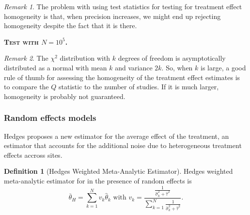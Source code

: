 \documentclass[
]{book}
\theoremstyle{definition}
\newtheorem{definition}{Definition}[chapter]
\theoremstyle{definition}
\theoremstyle{definition}
\theoremstyle{definition}
\theoremstyle{remark}
\newtheorem*{remark}{Remark}
\begin{document}
\begin{remark}
\iffalse{} {Remark. } \fi{}The problem with using test statistics for testing for treatment effect homogeneity is that, when precision increases, we might end up rejecting homogeneity despite the fact that it is there.
\end{remark}

\textbf{\textsc{Test with \(N=10^5\).}}

\begin{remark}
\iffalse{} {Remark. } \fi{}The \(\chi^2\) distribution with \(k\) degrees of freedom is asymptotically distributed as a normal with mean \(k\) and variance \(2k\).
So, when \(k\) is large, a good rule of thumb for assessing the homogeneity of the treatment effect estimates is to compare the \(Q\) statistic to the number of studies.
If it is much larger, homogeneity is probably not guaranteed.
\end{remark}

\hypertarget{sec:RE}{%
\subsubsection{Random effects models}\label{sec:RE}}

Hedges proposes a new estimator for the average effect of the treatment, an estimator that accounts for the additional noise due to heterogeneous treatment effects accross sites.

\begin{definition}[Hedges Weighted Meta-Analytic Estimator]
\protect\hypertarget{def:Hmetaweights}{}{\label{def:Hmetaweights} \iffalse (Hedges Weighted Meta-Analytic Estimator) \fi{} }Hedges weighted meta-analytic estimator for in the presence of random effects is
\[
\bar{\theta}_H = \sum_{k=1}^Nv_k\hat{\theta}_k \text{ with } v_k=\frac{\frac{1}{\hat{\sigma}^2_k+\hat{\tau}^2}}{\sum_{k=1}^N\frac{1}{\hat{\sigma}^2_k+\hat{\tau}^2}}.
\]
\end{definition}
\end{document}
